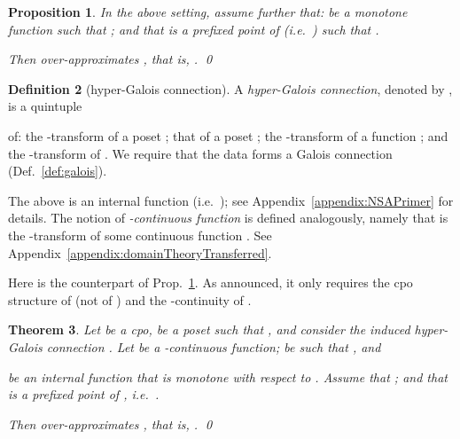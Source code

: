 \documentclass[envcountsect,orivec]{llncs} \pdfoutput=1
\newtheorem{mythm}{Theorem}[section]
\newtheorem{myprop}[mythm]{Proposition}
\theoremstyle{definition}
\newtheorem{mydef}[mythm]{Definition}
\def\myqed{\qed}
\begin{document}
\begin{myprop}\label{prop:galois}
In the above setting, assume further that:   be a monotone function such that
 ; and that 
 is a prefixed point of   
 (i.e.\ )
 such that .

Then  over-approximates , that is,
.
\myqed
\end{myprop}




\begin{mydef}[hyper-Galois connection]
\label{def:hyperGalois}
 A \emph{hyper-Galois connection}, denoted by
 ,
 is a quintuple
 
 of: the -transform of a poset ; that of a poset ;
 the -transform  of a
 function
 ; and  the -transform
  of . We require that the data
  forms a Galois connection (Def.~\ref{def:galois}).
\end{mydef}
The above  is an internal
function (i.e.\ );
see Appendix~\ref{appendix:NSAPrimer} for details.
The notion of \emph{-continuous function}  is defined analogously, namely that  is 
the -transform of some continuous function . See
Appendix~\ref{appendix:domainTheoryTransferred}. 

Here is the counterpart of Prop.~\ref{prop:galois}. As
announced, it only requires the cpo structure of  (not of ) and the -continuity of .

\begin{mythm}
\label{thm:newgaloiswithinf}
 Let  be a cpo, 
 be a poset such that , and
 consider the induced hyper-Galois connection 
 .
 Let  
 be a -continuous function;  
   be such that
, and 
  
 be an internal function
that is monotone with respect to .
 Assume that ;
 and that  is a prefixed
 point of , i.e.\
 .

Then  over-approximates , that is, 
 .
\myqed
\end{mythm}
\end{document}
